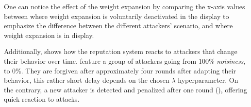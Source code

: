 One can notice the effect of the weight expansion by comparing the x-axis values between  where weight expansion is voluntarily deactivated in the display to emphasize the difference between the different attackers' scenario, and  where weight expansion is in display. 

Additionally,  shows how the reputation system reacts to attackers that change their behavior over time. 
 feature a group of attackers going from 100\% \emph{noisiness}, to 0\%. 
They are forgiven after approximately four rounds after adapting their behavior, this rather short delay depends on the chosen $\lambda$ hyperparameter. 
On the contrary, a new attacker is detected and penalized after one round (), offering quick reaction to attacks. 




  
